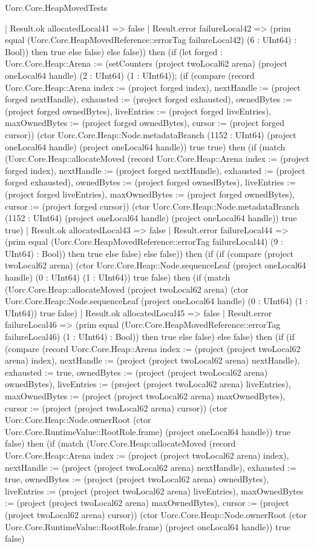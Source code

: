 \begin{lexlean}{Uorc.Core.HeapMovedTests}
\begin{semanticmodule}
{        | Result.ok allocatedLocal41 => false
        | Result.error failureLocal42 => (prim equal (Uorc.Core.HeapMovedReference::errorTag failureLocal42) (6 : UInt64) : Bool)) then true else false) else false)) then (if (let forged : Uorc.Core.Heap::Arena := (setCounters (project twoLocal62 arena) (project oneLocal64 handle) (2 : UInt64) (1 : UInt64)); (if (compare (record Uorc.Core.Heap::Arena {index := (project forged index), nextHandle := (project forged nextHandle), exhausted := (project forged exhausted), ownedBytes := (project forged ownedBytes), liveEntries := (project forged liveEntries), maxOwnedBytes := (project forged ownedBytes), cursor := (project forged cursor)}) (ctor Uorc.Core.Heap::Node.metadataBranch (1152 : UInt64) (project oneLocal64 handle) (project oneLocal64 handle)) true true) then (if (match (Uorc.Core.Heap::allocateMoved (record Uorc.Core.Heap::Arena {index := (project forged index), nextHandle := (project forged nextHandle), exhausted := (project forged exhausted), ownedBytes := (project forged ownedBytes), liveEntries := (project forged liveEntries), maxOwnedBytes := (project forged ownedBytes), cursor := (project forged cursor)}) (ctor Uorc.Core.Heap::Node.metadataBranch (1152 : UInt64) (project oneLocal64 handle) (project oneLocal64 handle)) true true)
        | Result.ok allocatedLocal43 => false
        | Result.error failureLocal44 => (prim equal (Uorc.Core.HeapMovedReference::errorTag failureLocal44) (9 : UInt64) : Bool)) then true else false) else false)) then (if (if (compare (project twoLocal62 arena) (ctor Uorc.Core.Heap::Node.sequenceLeaf (project oneLocal64 handle) (0 : UInt64) (1 : UInt64)) true false) then (if (match (Uorc.Core.Heap::allocateMoved (project twoLocal62 arena) (ctor Uorc.Core.Heap::Node.sequenceLeaf (project oneLocal64 handle) (0 : UInt64) (1 : UInt64)) true false)
        | Result.ok allocatedLocal45 => false
        | Result.error failureLocal46 => (prim equal (Uorc.Core.HeapMovedReference::errorTag failureLocal46) (1 : UInt64) : Bool)) then true else false) else false) then (if (if (compare (record Uorc.Core.Heap::Arena {index := (project (project twoLocal62 arena) index), nextHandle := (project (project twoLocal62 arena) nextHandle), exhausted := true, ownedBytes := (project (project twoLocal62 arena) ownedBytes), liveEntries := (project (project twoLocal62 arena) liveEntries), maxOwnedBytes := (project (project twoLocal62 arena) maxOwnedBytes), cursor := (project (project twoLocal62 arena) cursor)}) (ctor Uorc.Core.Heap::Node.ownerRoot (ctor Uorc.Core.RuntimeValue::RootRole.frame) (project oneLocal64 handle)) true false) then (if (match (Uorc.Core.Heap::allocateMoved (record Uorc.Core.Heap::Arena {index := (project (project twoLocal62 arena) index), nextHandle := (project (project twoLocal62 arena) nextHandle), exhausted := true, ownedBytes := (project (project twoLocal62 arena) ownedBytes), liveEntries := (project (project twoLocal62 arena) liveEntries), maxOwnedBytes := (project (project twoLocal62 arena) maxOwnedBytes), cursor := (project (project twoLocal62 arena) cursor)}) (ctor Uorc.Core.Heap::Node.ownerRoot (ctor Uorc.Core.RuntimeValue::RootRole.frame) (project oneLocal64 handle)) true false)
}
\end{semanticmodule}
\end{lexlean}
